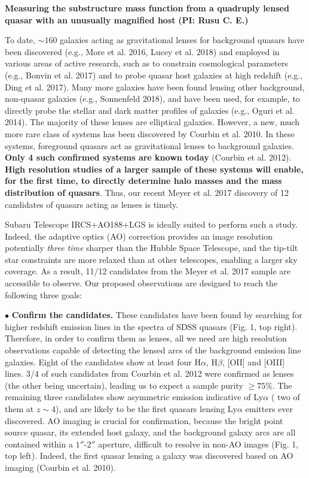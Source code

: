 \documentclass[a4paper,11pt]{article}
\begin{document}
\begin {centering}
{\bf Measuring the substructure mass function from a quadruply lensed quasar with an unusually magnified host} {\bf (PI: Rusu C. E.)}\\
 \end{centering}
 
\medskip

To date, $\sim160$ galaxies acting as gravitational lenses for background quasars have been discovered (e.g., More et al. 2016, Lucey et al. 2018) and employed in various areas of active research, such as to constrain cosmological parameters (e.g., Bonvin et al. 2017) and to probe quasar host galaxies at high redshift (e.g., Ding et al. 2017). Many more galaxies have been found lensing other background, non-quasar galaxies (e.g., Sonnenfeld 2018), and have been used, for example, to directly probe the stellar and dark matter profiles of galaxies (e.g., Oguri et al. 2014). The majority of these lenses are elliptical galaxies. However, a new, much more rare class of systems has been discovered by Courbin et al. 2010. In these systems, foreground quasars act as gravitational lenses to background galaxies. {\bf Only 4 such confirmed systems are known today} (Courbin et al. 2012). {\bf High resolution studies of a larger sample of these systems will enable, for the first time, to directly determine halo masses and the mass distribution of quasars}. Thus, our recent Meyer et al. 2017 discovery  of 12 candidates of quasars acting as lenses is timely. 

Subaru Telescope IRCS+AO188+LGS is ideally suited to perform such a study. Indeed, the adaptive optics (AO) correction provides an image resolution potentially {\it three time} sharper than the Hubble Space Telescope, and the tip-tilt star constraints are more relaxed than at other telescopes, enabling a larger sky coverage. As a result, 11/12 candidates from the Meyer et al. 2017 sample are accessible to observe. Our proposed observations are designed to reach the following three goals:

$\bullet$ {\bf Confirm the candidates.} These candidates have been found by searching for higher redshift emission lines in the spectra of SDSS quasars (Fig. 1, top right). Therefore, in order to confirm them as lenses, all we need are high resolution observations capable of detecting the lensed arcs of the background emission line galaxies. Eight of the candidates show at least four H$\alpha$, H$\beta$, [OII] and [OIII] lines. 3/4 of such candidates from Courbin et al. 2012 were confirmed as lenses (the other being uncertain), leading us to expect a sample purity $\geq75\%$. The remaining three candidates show asymmetric emission indicative of Ly$\alpha$ ( two of them at $z\sim4$), and are likely to be the first quasars lensing Ly$\alpha$ emitters ever discovered. AO imaging is crucial for confirmation, because the bright point source quasar, its extended host galaxy, and the background galaxy arcs are all contained within a $1''$-$2''$ aperture, difficult to resolve in non-AO images (Fig. 1, top left). Indeed, the first quasar lensing a galaxy was discovered based on AO imaging (Courbin et al. 2010).
\end{document}
